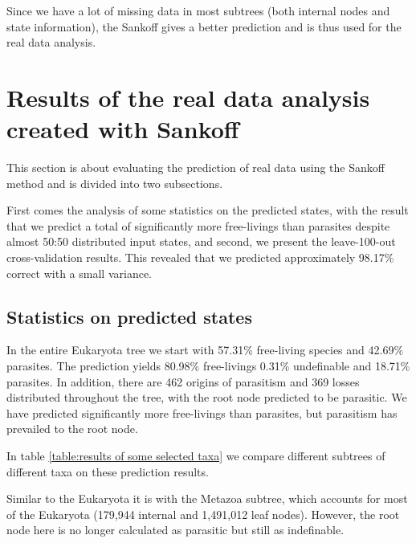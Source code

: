     Since we have a lot of missing data in most subtrees (both internal nodes and state information), 
      the Sankoff gives a better prediction and is thus used for the real data analysis. \\

  \section{Results of the real data analysis created with Sankoff}
    This section is about evaluating the prediction of real data using the Sankoff method and is 
      divided into two subsections.

    First comes the analysis of some statistics on the predicted states, with the result that we 
      predict a total of significantly more free-livings than parasites despite almost 50:50 
      distributed input states, and second, we present the leave-100-out cross-validation results. This 
      revealed that we predicted approximately 98.17\% correct with a small variance.

    \subsection{Statistics on predicted states}
      In the entire Eukaryota tree we start with 57.31\% free-living species and 42.69\% parasites. The 
        prediction yields 80.98\% free-livings 0.31\% undefinable and 18.71\% parasites. In addition, 
        there are 462 origins of parasitism and 369 losses distributed throughout the tree, with the 
        root node predicted to be parasitic. We have predicted significantly more free-livings than 
        parasites, but parasitism has prevailed to the root node.
      
      In table \ref{table:results of some selected taxa} we compare different subtrees of different taxa 
        on these prediction results.
      
      Similar to the Eukaryota it is with the Metazoa subtree, which accounts for most of the Eukaryota 
        (179,944 internal and 1,491,012 leaf nodes). However, the root node here is no longer calculated 
        as parasitic but still as indefinable.

